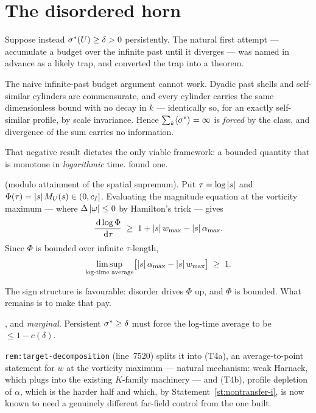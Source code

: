 \section{The disordered horn}
\label{sec:disordered-horn}

Suppose instead \(\sigma^{*}(U)\ge\delta>0\) persistently. The natural first
attempt --- accumulate a budget over the infinite past until it diverges ---
was named in advance as a likely trap, and  converted the trap into a
theorem.

\begin{statement}
\label{st:nobudget}
\IMPOSSIBLE{} The naive infinite-past budget argument cannot work. Dyadic past
shells and self-similar cylinders are commensurate, and every cylinder carries
the same dimensionless bound with no decay in \(k\) --- identically so, for an
exactly self-similar profile, by scale invariance. Hence
\(\sum_k\langle\sigma^{*}\rangle=\infty\) is \emph{forced} by the class, and
divergence of the sum carries no information.
\end{statement}

That negative result dictates the only viable framework: a bounded quantity
that is monotone in \emph{logarithmic} time.  found one.

\begin{statement}
\label{st:logtime}
\PROVED{} (modulo attainment of the spatial supremum). Put
\(\tau=\log\left|s\right|\) and \(\Phi(\tau)=\left|s\right|M_U(s)\in(0,c_I]\). Evaluating
the magnitude equation at the vorticity maximum --- where \(\Delta\left|\omega\right|\le0\)
by Hamilton's trick --- gives
\[
  \frac{\,\mathrm{d}\log\Phi}{\,\mathrm{d}\tau}
  \;\ge\; 1 + \left|s\right|w_{\max} - \left|s\right|\alpha_{\max}.
\]
Since \(\Phi\) is bounded over infinite \(\tau\)-length,
\[
  \limsup_{\text{log-time average}}
    \bigl[\left|s\right|\alpha_{\max} - \left|s\right|w_{\max}\bigr] \;\ge\; 1 .
\]
\end{statement}

The sign structure is favourable: disorder drives \(\Phi\) up, and \(\Phi\) is
bounded. What remains is to make that pay.

\begin{statement}
\label{st:target-dd}
\OPEN{}, and \emph{marginal}. Persistent \(\sigma^{*}\ge\delta\) must force the
log-time average to be \(\le1-c(\delta)\).
\end{statement}

\texttt{rem:target-decomposition} (line~7520) splits it into (T4a), an
average-to-point statement for \(w\) at the vorticity maximum --- natural
mechanism: weak Harnack, which plugs into the existing \(K\)-family machinery
--- and (T4b), profile depletion of \(\alpha\), which is the harder half and
which, by Statement~\ref{st:nontransfer-i}, is now known to need a genuinely
different far-field control from the one  built.

